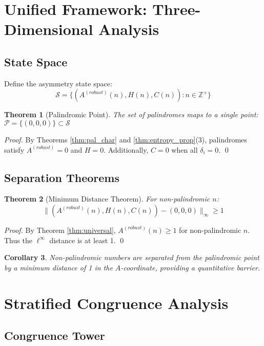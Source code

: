 \documentclass[12pt,a4paper]{article}
\newtheorem{theorem}{Theorem}[section]
\newtheorem{corollary}[theorem]{Corollary}
\begin{document}
\section{Unified Framework: Three-Dimensional Analysis}

\subsection{State Space}

Define the asymmetry state space:
$$\mathcal{S} = \{(A^{(robust)}(n), H(n), C(n)) : n \in \mathbb{Z}^+\}$$

\begin{theorem}[Palindromic Point]\label{thm:pal_point}
The set of palindromes maps to a single point: $\mathcal{P} = \{(0, 0, 0)\} \subset \mathcal{S}$
\end{theorem}

\begin{proof}
By Theorems \ref{thm:pal_char} and \ref{thm:entropy_prop}(3), palindromes satisfy $A^{(robust)} = 0$ and $H = 0$. Additionally, $C = 0$ when all $\delta_i = 0$. \qed
\end{proof}

\subsection{Separation Theorems}

\begin{theorem}[Minimum Distance Theorem]\label{thm:min_dist}
For non-palindromic $n$:
$$\|(A^{(robust)}(n), H(n), C(n)) - (0,0,0)\|_\infty \geq 1$$
\end{theorem}

\begin{proof}
By Theorem \ref{thm:universal}, $A^{(robust)}(n) \geq 1$ for non-palindromic $n$. Thus the $\ell^\infty$ distance is at least 1. \qed
\end{proof}

\begin{corollary}
Non-palindromic numbers are separated from the palindromic point by a minimum distance of 1 in the $A$-coordinate, providing a quantitative barrier.
\end{corollary}

\section{Stratified Congruence Analysis}

\subsection{Congruence Tower}
\end{document}
